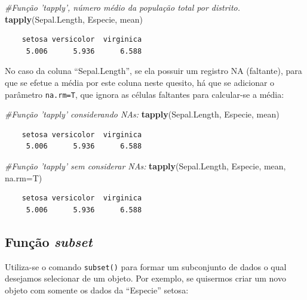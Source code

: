 \documentclass[12pt,portuguese,oneside]{book}
\newenvironment{Shaded}{\begin{snugshade}}{\end{snugshade}}
\newcommand{\KeywordTok}[1]{\textcolor[rgb]{0.13,0.29,0.53}{\textbf{#1}}}
\newcommand{\DataTypeTok}[1]{\textcolor[rgb]{0.13,0.29,0.53}{#1}}
\newcommand{\CommentTok}[1]{\textcolor[rgb]{0.56,0.35,0.01}{\textit{#1}}}
\newcommand{\NormalTok}[1]{#1}
\begin{document}
\begin{Shaded}
\begin{Highlighting}[]
\CommentTok{#Função 'tapply', número médio da população total por distrito.}
\KeywordTok{tapply}\NormalTok{(Sepal.Length, Especie, mean)}
\end{Highlighting}
\end{Shaded}

\begin{verbatim}
    setosa versicolor  virginica 
     5.006      5.936      6.588 
\end{verbatim}

No caso da coluna ``Sepal.Length'', se ela possuir um registro NA
(faltante), para que se efetue a média por este coluna neste quesito, há
que se adicionar o parâmetro \texttt{na.rm=T}, que ignora as células
faltantes para calcular-se a média:

\begin{Shaded}
\begin{Highlighting}[]
\CommentTok{#Função 'tapply' considerando NAs:}
\KeywordTok{tapply}\NormalTok{(Sepal.Length, Especie, mean)}
\end{Highlighting}
\end{Shaded}

\begin{verbatim}
    setosa versicolor  virginica 
     5.006      5.936      6.588 
\end{verbatim}

\begin{Shaded}
\begin{Highlighting}[]
\CommentTok{#Função 'tapply' sem considerar NAs:}
\KeywordTok{tapply}\NormalTok{(Sepal.Length, Especie, mean, }\DataTypeTok{na.rm=}\NormalTok{T)}
\end{Highlighting}
\end{Shaded}

\begin{verbatim}
    setosa versicolor  virginica 
     5.006      5.936      6.588 
\end{verbatim}

\subsection{\texorpdfstring{Função
\emph{subset}}{Função subset}}\label{funcao-subset}

Utiliza-se o comando \texttt{subset()} para formar um subconjunto de
dados o qual desejamos selecionar de um objeto. Por exemplo, se
quisermos criar um novo objeto com somente os dados da ``Especie''
setosa:
\end{document}
